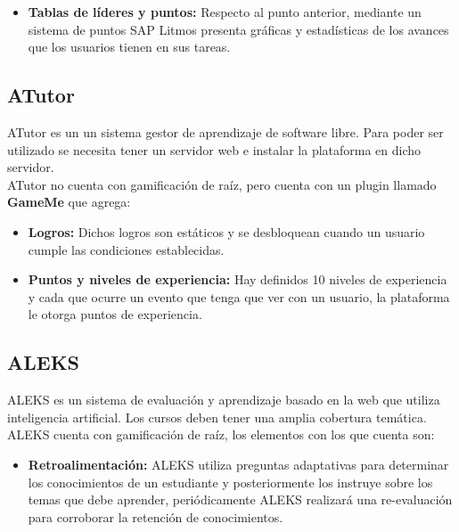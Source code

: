 \begin{multicols*}{2}
\begin{itemize}
        \item {\bf Tablas de líderes y puntos:} Respecto al punto anterior,
        mediante un sistema de puntos SAP Litmos presenta gráficas y estadísticas
        de los avances que los usuarios tienen en sus tareas.

    \end{itemize}


\subsection{ATutor}

 ATutor \cite{PagATutor} es un un sistema gestor de aprendizaje de software libre. Para poder
 ser utilizado se necesita tener un servidor web e instalar la plataforma en dicho servidor.\\

    \noindent ATutor no cuenta con gamificación de raíz,
    pero cuenta con un plugin llamado \textbf{GameMe} que agrega:

    \begin{itemize}
        \item {\bf Logros:} Dichos logros son estáticos y se
        desbloquean cuando un usuario cumple las condiciones
        establecidas.

        \item {\bf Puntos y niveles de experiencia:} Hay definidos 10
        niveles de experiencia y cada que ocurre un evento que tenga
        que ver con un usuario, la plataforma le otorga puntos de
        experiencia.

    \end{itemize}

\subsection{ALEKS}

 ALEKS \cite{PagALEKS} es un sistema de evaluación y aprendizaje basado en la web que
 utiliza inteligencia artificial. Los cursos deben tener una amplia cobertura temática.\\

 \noindent ALEKS cuenta con gamificación de raíz, los elementos con los que cuenta son:

    \begin{itemize}
        \item {\bf Retroalimentación:} ALEKS utiliza preguntas adaptativas para
            determinar los conocimientos de un estudiante y posteriormente los
            instruye sobre los temas que debe aprender, periódicamente ALEKS
            realizará una re-evaluación para corroborar la retención de
            conocimientos.


\end{itemize}
\end{multicols*}
